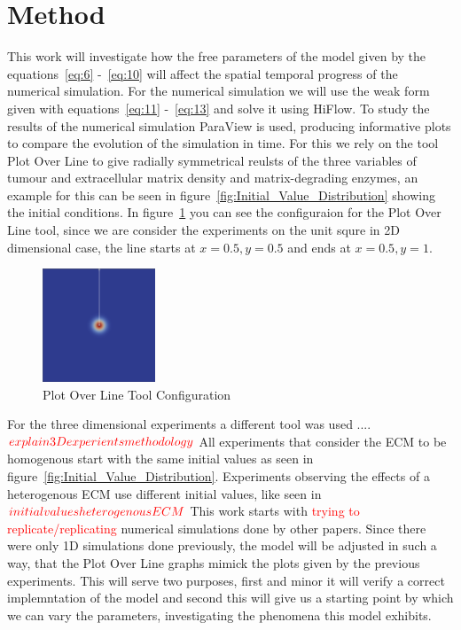 

\section{Method}


This work will investigate how the free parameters of the model given by the equations~\ref{eq:6} -~\ref{eq:10} will affect the spatial temporal progress of the numerical simulation. For the numerical simulation we will use the weak form given with equations~\ref{eq:11} -~\ref{eq:13} and solve it using HiFlow. To study the results of the numerical simulation ParaView is used, producing informative plots to compare the evolution of the simulation in time. For this we rely on the tool Plot Over Line to give radially symmetrical reulsts of the three variables of tumour and extracellular matrix density and matrix-degrading enzymes, an example for this can be seen in figure~\ref{fig:Initial_Value_Distribution} showing the initial conditions. In figure~\ref{fig:PlotOverLine} you can see the configuraion for the Plot Over Line tool, since we are consider the experiments on the unit squre in 2D dimensional case, the line starts at $x=0.5, y=0.5$ and ends at $x=0.5, y=1$.\newline
\begin{figure}[h]
    \centering
    \includegraphics[width=0.3\textwidth]{resources/images/plot_over_line_tool.png}
    \caption{Plot Over Line Tool Configuration}
    \label{fig:PlotOverLine}
\end{figure}
For the three dimensional experiments a different tool was used ....$\textcolor{red}{explain 3D experients methodology}$
All experiments that consider the ECM to be homogenous start with the same initial values as seen in figure~\ref{fig:Initial_Value_Distribution}. Experiments observing the effects of a heterogenous ECM use different initial values, like seen in $\textcolor{red}{initial values heterogenous ECM}$\newline 
This work starts with \textcolor{red}{trying to replicate/replicating} numerical simulations done by other papers. Since there were only 1D simulations done previously, the model will be adjusted in such a way, that the Plot Over Line graphs mimick the plots given by the previous experiments. This will serve two purposes, first and minor it will verify a correct implemntation of the model and second this will give us a starting point by which we can vary the parameters, investigating the phenomena this model exhibits. \newline 
